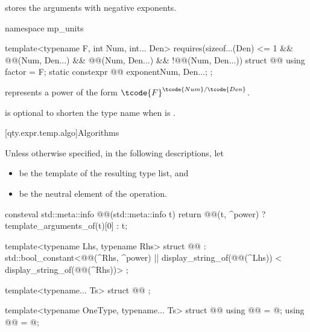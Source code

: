 \pnum
{} stores the arguments with negative exponents.

\begin{codeblock}
namespace mp_units {

template<typename F, int Num, int... Den>
  requires(sizeof...(Den) <= 1 && @@(Num, Den...) && @@(Num, Den...) &&
           !@@(Num, Den...))
struct @@ {
  using factor = F;
  static constexpr @@ exponent{Num, Den...};
};

}
\end{codeblock}

\pnum
{} represents a power
of the form $\tcode{F}^{\tcode{Num}/\tcode{Den}}$.
\begin{note}
 is optional to shorten the type name when  is .
\end{note}

[qty.expr.temp.algo]{Algorithms}

\pnum
Unless otherwise specified, in the following descriptions, let
\begin{itemize}
\item
{} be the template of the resulting type list, and
\item
{} be the neutral element of the operation.
\end{itemize}

\begin{codeblock}
consteval std::meta::info @@(std::meta::info t)
{
  return @@(t, ^power) ? template_arguments_of(t)[0] : t;
}

template<typename Lhs, typename Rhs>
struct @@ :
    std::bool_constant<@@(^Rhs, ^power) ||
                       display_string_of(@@(^Lhs)) <
                         display_string_of(@@(^Rhs))> {
};
\end{codeblock}

\begin{codeblock}
template<typename... Ts>
struct @@ {};

template<typename OneType, typename... Ts>
struct @@ {
  using @@ = @\seebelownc@;
  using @@ = @\seebelownc@;
}
\end{codeblock}


